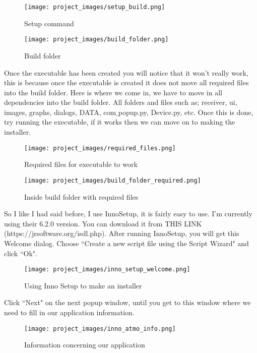 \begin{figure}[H]
\centering
\texttt{[image: project\_images/setup\_build.png]}
 \caption{Setup command}
 \label{fig:setup command}
\end{figure}	

\begin{figure}[H]
\centering
\texttt{[image: project\_images/build\_folder.png]}
 \caption{Build folder}
 \label{fig:build folder}
\end{figure}	
	
	Once the executable has been created you will notice that it won't really work, this is because once the executable is created it does not move all required files into the build folder. Here is where we come in, we have to move in all dependencies into the build folder. All folders and files such as; receiver, ui, images, graphs, dialogs, DATA, com$\_$popup.py, Device.py, etc. Once this is done, try running the executable, if it works then we can move on to making the installer.

\begin{figure}[H]
\centering
\texttt{[image: project\_images/required\_files.png]}
 \caption{Required files for executable to work}
 \label{fig:required files}
\end{figure}	

\begin{figure}[H]
\centering
\texttt{[image: project\_images/build\_folder\_required.png]}
 \caption{Inside build folder with required files}
 \label{fig:required files in build folder}
\end{figure}	

	So I like I had said before, I use InnoSetup, it is fairly easy to use. I'm currently using their 6.2.0 version. You can download it from THIS LINK (https://jrsoftware.org/isdl.php).
	After running InnoSetup, you will get this Welcome dialog. Choose ``Create a new script file using the Script Wizard" and click ``Ok".

\begin{figure}[H]
\centering
\texttt{[image: project\_images/inno\_setup\_welcome.png]}
 \caption{Using Inno Setup to make an installer}
 \label{fig:inno setup welcome}
\end{figure}

	Click ``Next" on the next popup window, until you get to this window where we need to fill in our application information.

\begin{figure}[H]
\centering
\texttt{[image: project\_images/inno\_atmo\_info.png]}
 \caption{Information concerning our application}
 \label{fig:inno atmo info}
\end{figure}


